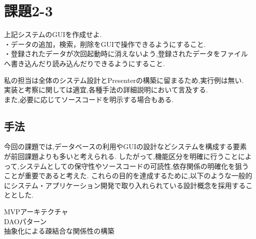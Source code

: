 \documentclass[uplatex,12pt]{jsarticle}
\begin{document}
\section{課題2-3}
\begin{screen}
    上記システムのGUIを作成せよ.\\
    ・データの追加，検索，削除をGUIで操作できるようにすること. \\
    ・登録されたデータが次回起動時に消えないよう,登録されたデータをファイルへ書き込んだり読み込んだりできるようにすること.
\end{screen}
\noindent
私の担当は全体のシステム設計とPresenterの構築に留まるため,実行例は無い. \\
実装と考察に関しては適宜,各種手法の詳細説明において言及する. \\
また,必要に応じてソースコードを明示する場合もある. \\

\subsection{手法}
今回の課題では,データベースの利用やGUIの設計などシステムを構成する要素が前回課題よりも多いと考えられる.
したがって,機能区分を明確に行うことによって,システムとしての保守性やソースコードの可読性,依存関係の明確化を狙うことが重要であると考えた.
これらの目的を達成するために,以下のような一般的にシステム・アプリケーション開発で取り入れられている設計概念を採用することとした.
\begin{description}
    \item[MVPアーキテクチャ]
    \item[DAOパターン]
    \item[抽象化による疎結合な関係性の構築]
\end{description}
\end{document}
